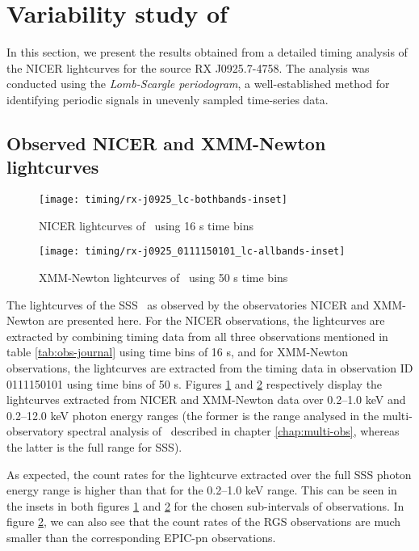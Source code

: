	\newpage
	\section{Variability study of \source} \label{results:variability}
		In this section, we present the results obtained from a detailed timing analysis of the NICER lightcurves for the source RX J0925.7-4758. The analysis was conducted using the \textit{Lomb-Scargle periodogram}, a well-established method for identifying periodic signals in unevenly sampled time-series data.
	
		\subsection{Observed NICER and XMM-Newton lightcurves}
			\begin{figure}[h!]
				\centering
				\texttt{[image: timing/rx-j0925\_lc-bothbands-inset]}
				\caption{NICER lightcurves of \source\ using 16 s time bins}
				\label{result:lc-mrvel-nicer}
			\end{figure}
			
			\begin{figure}[h!]
				\centering
				\texttt{[image: timing/rx-j0925\_0111150101\_lc-allbands-inset]}
				\caption{XMM-Newton lightcurves of \source\ using 50 s time bins}
				\label{result:lc-mrvel-xmm}
			\end{figure}
			
			The lightcurves of the SSS \source\ as observed by the observatories NICER and XMM-Newton are presented here. For the NICER observations, the lightcurves are extracted by combining timing data from all three observations mentioned in table \ref{tab:obs-journal} using time bins of 16 s, and for XMM-Newton observations, the lightcurves are extracted from the timing data in observation ID 0111150101 using time bins of 50 s. Figures \ref{result:lc-mrvel-nicer} and \ref{result:lc-mrvel-xmm} respectively display the lightcurves extracted from NICER and XMM-Newton data over 0.2--1.0 keV and 0.2--12.0 keV photon energy ranges (the former is the range analysed in the multi-observatory spectral analysis of \source\ described in chapter \ref{chap:multi-obs}, whereas the latter is the full range for SSS).
			
			As expected, the count rates for the lightcurve extracted over the full SSS photon energy range is higher than that for the 0.2--1.0 keV range. This can be seen in the insets in both figures \ref{result:lc-mrvel-nicer} and \ref{result:lc-mrvel-xmm} for the chosen sub-intervals of observations. In figure \ref{result:lc-mrvel-xmm}, we can also see that the count rates of the RGS observations are much smaller than the corresponding EPIC-pn observations.
			
